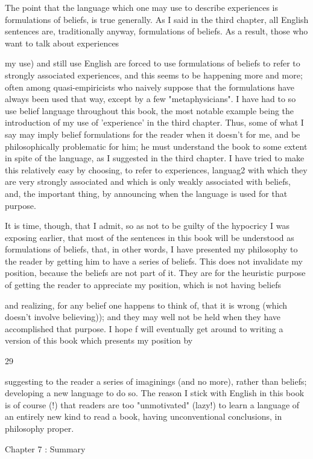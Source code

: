 \documentclass[10pt,twoside]{memoir}
\begin{document}
\begin{enumerate}
{{The point that the language which one may use to describe experiences 
is formulations of beliefs, is true generally. As I said in the third chapter, all 
English sentences are, traditionally anyway, formulations of beliefs. As a 
result, those who want to talk about experiences {my use) and still use 
English are forced to use formulations of beliefs to refer to strongly 
associated experiences, and this seems to be happening more and more; often 
among quasi-empiricists who naively suppose that the formulations have 
always been used that way, except by a few "metaphysicians". I have had to 
so use belief language throughout this book, the most notable example being 
the introduction of my use of 'experience' in the third chapter. Thus, some 
of what I say may imply belief formulations for the reader when it doesn't 
for me, and be philosophically problematic for him; he must understand the 
book to some extent in spite of the language, as I suggested in the third 
chapter. I have tried to make this relatively easy by choosing, to refer to 
experiences, languag2 with which they are very strongly associated and 
which is only weakly associated with beliefs, and, the important thing, by 
announcing when the language is used for that purpose. 

It is time, though, that I admit, so as not to be guilty of the hypocricy I 
was exposing earlier, that most of the sentences in this book will be 
understood as formulations of beliefs, that, in other words, I have presented 
my philosophy to the reader by getting him to have a series of beliefs. This 
does not invalidate my position, because the beliefs are not part of it. They 
are for the heuristic purpose of getting the reader to appreciate my position, 
which is not having beliefs {and realizing, for any belief one happens to think 
of, that it is wrong (which doesn't involve believing)); and they may well not 
be held when they have accomplished that purpose. I hope f will eventually 
get around to writing a version of this book which presents my position by 


29 


suggesting to the reader a series of imaginings (and no more), rather than 
beliefs; developing a new language to do so. The reason I stick with English 
in this book is of course (!) that readers are too "unmotivated" (lazy!) to 
learn a language of an entirely new kind to read a book, having 
unconventional conclusions, in philosophy proper. 


Chapter 7 : Summary 


}}}}
\end{enumerate}
\end{document}

